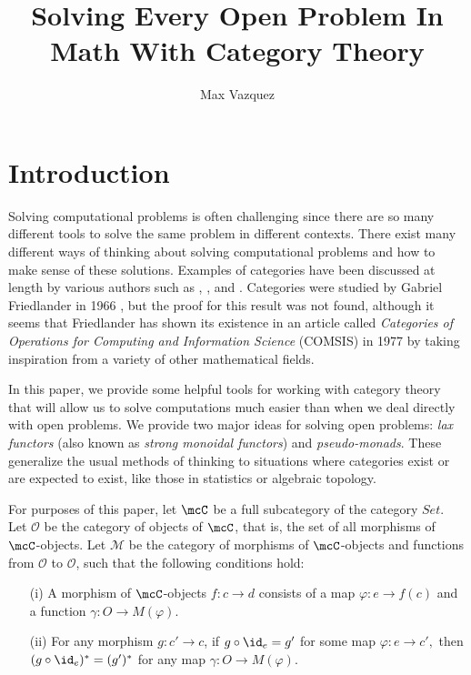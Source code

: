 \documentclass[a4paper,reqno,oneside]{article}
\begin{document}
\title{Solving Every Open Problem In Math With Category Theory}
\author{Max Vazquez}
\maketitle


\section{Introduction}
\label{sec:intro}
Solving computational problems is often challenging since there are so many different tools to solve the same problem in different contexts. There exist many different ways of thinking about solving computational problems and how to make sense of these solutions. Examples of categories have been discussed at length by various authors such as \cite{Friedlander2023,Rozenblythe2018}, \cite{Freed2020,Haugseng2018}, and \cite{Scholze1977}. Categories were studied by Gabriel Friedlander in 1966 \cite{Friedlander1966}, but the proof for this result was not found, although it seems that Friedlander has shown its existence in an article called \textit{Categories of Operations for Computing and Information Science} (COMSIS) in 1977 by taking inspiration from a variety of other mathematical fields.

In this paper, we provide some helpful tools for working with category theory that will allow us to solve computations much easier than when we deal directly with open problems. We provide two major ideas for solving open problems: \textit{lax functors} (also known as \textit{strong monoidal functors}) and \textit{pseudo-monads}. These generalize the usual methods of thinking to situations where categories exist or are expected to exist, like those in statistics or algebraic topology.

For purposes of this paper, let $\mcC$ be a full subcategory of the category $Set$. Let $\mathcal{O}$ be the category of objects of $\mcC$, that is, the set of all morphisms of $\mcC$-objects. Let $\mathcal{M}$ be the category of morphisms of $\mcC$-objects and functions from $\mathcal{O}$ to $\mathcal{O}$, such that the following conditions hold:
\begin{enumerate}[label=(\roman*)]
	\item[(i)] A morphism of $\mcC$-objects $f : c \to d$ consists of a map $\varphi : e \to f(c)$ and a function $\gamma : O \to M(\varphi)$.
	\item[(ii)] For any morphism $g : c' \to c$, if $g \circ \id_{e} = g'$ for some map $\varphi : e \to c',$ then $(g \circ \id_{e})^{\ast} = (g')^{\ast}$ for any map $\gamma : O \to M(\varphi)$.
\end{enumerate}
\end{document}
